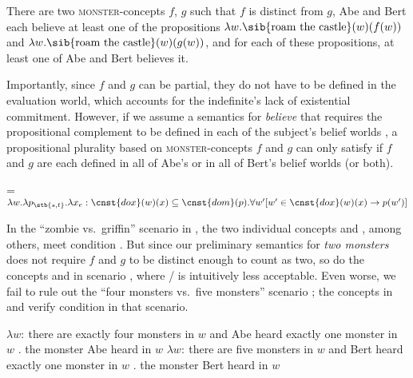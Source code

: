 \documentclass[output=paper]{langscibook}
\begin{document}
\ea \label{sch-has:ex:34} There are two \textsc{monster}-concepts $f$, $g$ such that $f$ is distinct from $g$, Abe and Bert each believe at least one of the propositions $\lambda w.\text{\sib{roam the castle}}(w)(f(w))$ and $\lambda w.\text{\sib{roam the castle}}(w)(g(w))$, and for each of these propositions, at least one of Abe and Bert believes it. \z

\noindent Importantly, since $f$ and $g$ can be partial, they do not have to be defined in the evaluation world, which accounts for the indefinite's lack of existential commitment. However, if we assume a semantics for \textit{believe} that requires the propositional complement to be defined in each of the subject's belief worlds , a propositional plurality based on \textsc{monster}-concepts $f$ and $g$ can only satisfy  if $f$ and $g$ are each defined in all of Abe's or in all of Bert's belief worlds (or both).

\ea \label{sch-has:ex:37a}  = $\lambda w.\lambda p_{\stb{s, t}}.\lambda x_e : \cnst{dox}(w)(x) \subseteq \cnst{dom}(p).\forall w'[w' \in \cnst{dox}(w)(x) \rightarrow p(w')]$\z

\noindent In the ``zombie vs.~griffin'' scenario in , the two individual concepts  and , among others, meet condition . But since our preliminary semantics for \textit{two monsters} does not require $f$ and $g$ to be distinct enough to count as two, so do the concepts  and  in scenario , where / is intuitively less acceptable. Even worse, we fail to rule out the ``four monsters vs.~five monsters'' scenario ; the concepts in  and  verify condition  in that scenario.

\ea \label{sch-has:ex:35}
\ea \label{sch-has:ex:35a} $\lambda w :\ $there are exactly four monsters in $w$ and Abe heard exactly one monster in $w$ . the monster Abe heard in $w$
\ex \label{sch-has:ex:35b} $\lambda w :\ $there are five monsters in $w$ and Bert heard exactly one monster in $w$ . the monster Bert heard in $w$ \z\z
\end{document}
